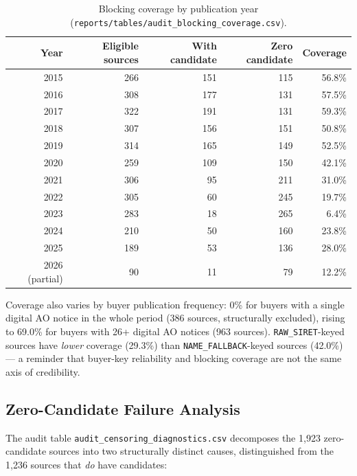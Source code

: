\documentclass[11pt]{article}
\begin{document}
\begin{table}[h!]
\centering
\caption{Blocking coverage by publication year
(\texttt{reports/tables/audit\_blocking\_coverage.csv}).}
\label{tab:blockyear}
\begin{tabular}{rrrrr}
\toprule
Year & Eligible sources & With candidate & Zero candidate & Coverage \\
\midrule
2015 & 266 & 151 & 115 & 56.8\% \\
2016 & 308 & 177 & 131 & 57.5\% \\
2017 & 322 & 191 & 131 & 59.3\% \\
2018 & 307 & 156 & 151 & 50.8\% \\
2019 & 314 & 165 & 149 & 52.5\% \\
2020 & 259 & 109 & 150 & 42.1\% \\
2021 & 306 & 95 & 211 & 31.0\% \\
2022 & 305 & 60 & 245 & 19.7\% \\
2023 & 283 & 18 & 265 & 6.4\% \\
2024 & 210 & 50 & 160 & 23.8\% \\
2025 & 189 & 53 & 136 & 28.0\% \\
2026 (partial) & 90 & 11 & 79 & 12.2\% \\
\bottomrule
\end{tabular}
\end{table}
Coverage also varies by buyer publication frequency: 0\% for buyers with a
single digital AO notice in the whole period (386 sources, structurally
excluded), rising to 69.0\% for buyers with 26+ digital AO notices (963
sources). \texttt{RAW\_SIRET}-keyed sources have \emph{lower} coverage
(29.3\%) than \texttt{NAME\_FALLBACK}-keyed sources (42.0\%) --- a
reminder that buyer-key reliability and blocking coverage are not the same
axis of credibility.

\subsection{Zero-Candidate Failure Analysis}
The audit table \texttt{audit\_censoring\_diagnostics.csv} decomposes the
1{,}923 zero-candidate sources into two structurally distinct causes,
distinguished from the 1{,}236 sources that \emph{do} have candidates:
\end{document}
